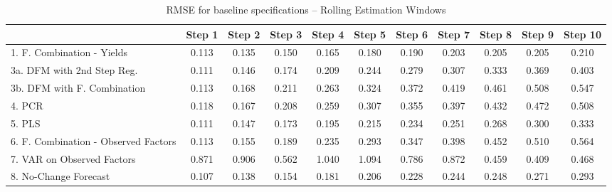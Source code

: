 \documentclass[11pt]{article}
\begin{document}
\begin{table}       
\caption{RMSE for baseline specifications -- Rolling Estimation Windows} \label{table_rmse_baseline}                                                                              
\center                                                                                           
\begin{tabular}{|l|c|c|c|c|c|c|c|c|c|c|}                                                          
\hline                                                                                            
&Step 1 &Step 2 &Step 3 &Step 4 &Step 5 &Step 6 &Step 7 &Step 8 &Step 9 &Step 10\\                
\hline                                                                                            
1. F. Combination - Yields          &0.113&0.135&0.150&0.165&0.180&0.190&0.203&0.205&0.205&0.210\\
3a. DFM with 2nd Step Reg.          &0.111&0.146&0.174&0.209&0.244&0.279&0.307&0.333&0.369&0.403\\
3b. DFM with F. Combination         &0.113&0.168&0.211&0.263&0.324&0.372&0.419&0.461&0.508&0.547\\
4. PCR                              &0.118&0.167&0.208&0.259&0.307&0.355&0.397&0.432&0.472&0.508\\
5. PLS                              &0.111&0.147&0.173&0.195&0.215&0.234&0.251&0.268&0.300&0.333\\
6. F. Combination - Observed Factors&0.113&0.155&0.189&0.235&0.293&0.347&0.398&0.452&0.510&0.564\\
7. VAR on Observed Factors          &0.871&0.906&0.562&1.040&1.094&0.786&0.872&0.459&0.409&0.468\\
8. No-Change Forecast               &0.107&0.138&0.154&0.181&0.206&0.228&0.244&0.248&0.271&0.293\\
\hline                                                                                            
\end{tabular}                                                                                     
\end{table}                                                                                       
\end{document}
